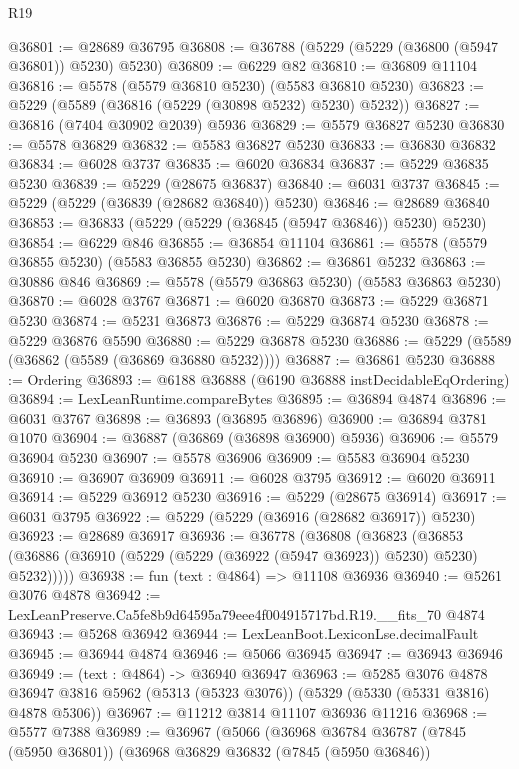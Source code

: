 \begin{lexlean}{R19}
\begin{coremodule}
@36801 := @28689 @36795
@36808 := @36788 (@5229 (@5229 (@36800 (@5947 @36801)) @5230) @5230)
@36809 := @6229 @82
@36810 := @36809 @11104
@36816 := @5578 (@5579 @36810 @5230) (@5583 @36810 @5230)
@36823 := @5229 (@5589 (@36816 (@5229 (@30898 @5232) @5230) @5232))
@36827 := @36816 (@7404 @30902 @2039) @5936
@36829 := @5579 @36827 @5230
@36830 := @5578 @36829
@36832 := @5583 @36827 @5230
@36833 := @36830 @36832
@36834 := @6028 @3737
@36835 := @6020 @36834
@36837 := @5229 @36835 @5230
@36839 := @5229 (@28675 @36837)
@36840 := @6031 @3737
@36845 := @5229 (@5229 (@36839 (@28682 @36840)) @5230)
@36846 := @28689 @36840
@36853 := @36833 (@5229 (@5229 (@36845 (@5947 @36846)) @5230) @5230)
@36854 := @6229 @846
@36855 := @36854 @11104
@36861 := @5578 (@5579 @36855 @5230) (@5583 @36855 @5230)
@36862 := @36861 @5232
@36863 := @30886 @846
@36869 := @5578 (@5579 @36863 @5230) (@5583 @36863 @5230)
@36870 := @6028 @3767
@36871 := @6020 @36870
@36873 := @5229 @36871 @5230
@36874 := @5231 @36873
@36876 := @5229 @36874 @5230
@36878 := @5229 @36876 @5590
@36880 := @5229 @36878 @5230
@36886 := @5229 (@5589 (@36862 (@5589 (@36869 @36880 @5232))))
@36887 := @36861 @5230
@36888 := Ordering
@36893 := @6188 @36888 (@6190 @36888 instDecidableEqOrdering)
@36894 := LexLeanRuntime.compareBytes
@36895 := @36894 @4874
@36896 := @6031 @3767
@36898 := @36893 (@36895 @36896)
@36900 := @36894 @3781 @1070
@36904 := @36887 (@36869 (@36898 @36900) @5936)
@36906 := @5579 @36904 @5230
@36907 := @5578 @36906
@36909 := @5583 @36904 @5230
@36910 := @36907 @36909
@36911 := @6028 @3795
@36912 := @6020 @36911
@36914 := @5229 @36912 @5230
@36916 := @5229 (@28675 @36914)
@36917 := @6031 @3795
@36922 := @5229 (@5229 (@36916 (@28682 @36917)) @5230)
@36923 := @28689 @36917
@36936 := @36778
    (@36808
      (@36823 (@36853 (@36886 (@36910 (@5229 (@5229 (@36922 (@5947 @36923)) @5230) @5230) @5232)))))
@36938 := fun (text : @4864) => @11108 @36936
@36940 := @5261 @3076 @4878
@36942 := LexLeanPreserve.Ca5fe8b9d64595a79eee4f004915717bd.R19.__fits_70 @4874
@36943 := @5268 @36942
@36944 := LexLeanBoot.LexiconLse.decimalFault
@36945 := @36944 @4874
@36946 := @5066 @36945
@36947 := @36943 @36946
@36949 := (text : @4864) -> @36940 @36947
@36963 := @5285
    @3076
    @4878
    @36947
    @3816
    @5962
    (@5313 (@5323 @3076))
    (@5329 (@5330 (@5331 @3816) @4878 @5306))
@36967 := @11212 @3814 @11107 @36936 @11216
@36968 := @5577 @7388
@36989 := @36967
    (@5066
      (@36968
        @36784
        @36787
        (@7845 (@5950 @36801))
        (@36968
          @36829
          @36832
          (@7845 (@5950 @36846))

\end{coremodule}
\end{lexlean}
